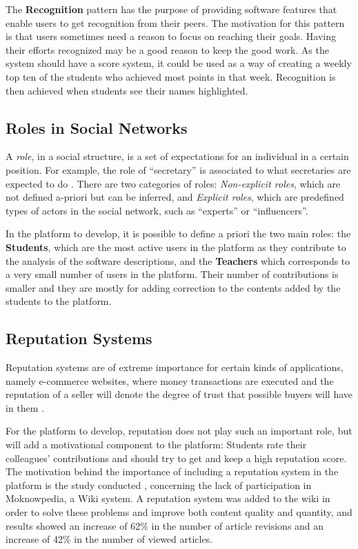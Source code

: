 \documentclass{llncs}
\begin{document}
The \textbf{Recognition} pattern has the purpose of providing software features that enable users to get recognition from their peers. The motivation for this pattern is that users sometimes need a reason to focus on reaching their goals. Having their efforts recognized may be a good reason to keep the good work\cite{oduor2014persuasive}. As the system should have a score system, it could be used as a way of creating a weekly top ten of the students who achieved most points in that week. Recognition is then achieved when students see their names highlighted.

\subsection{Roles in Social Networks}
A \textit{role}, in a social structure, is a set of expectations for an individual in a certain position. For example, the role of ``secretary'' is associated to what secretaries are expected to do \cite{forestier2012roles,nadel1957theory}. There are two categories of roles: \textit{Non-explicit roles}, which are not defined a-priori but can be inferred, and \textit{Explicit roles}, which are predefined types of actors in the social network, such as ``experts'' or ``influencers''.

In the platform to develop, it is possible to define a priori the two main roles: the \textbf{Students}, which are the most active users in the platform as they contribute to the analysis of the software descriptions, and the \textbf{Teachers} which corresponds to a very small number of users in the platform. Their number of contributions is smaller and they are mostly for adding correction to the contents added by the students to the platform.

\subsection{Reputation Systems}
\label{relatedWorkRepsys}
Reputation systems are of extreme importance for certain kinds of applications, namely e-commerce websites, where money transactions are executed and the reputation of a seller will denote the degree of trust that possible buyers will have in them \cite{vavilis2014reference}.

For the platform to develop, reputation does not play such an important role, but will add a motivational component to the platform: Students rate their colleagues' contributions and should try to get and keep a high reputation score. The motivation behind the importance of including a reputation system in the platform is the study conducted \cite{dencheva2011dynamic}, concerning the lack of participation in Moknowpedia, a Wiki system. A reputation system was added to the wiki in order to solve these problems and improve both content quality and quantity\cite{prause2008approach}, and results showed an increase of 62\% in the number of article revisions and an increase of 42\% in the number of viewed articles.
	
\end{document}
